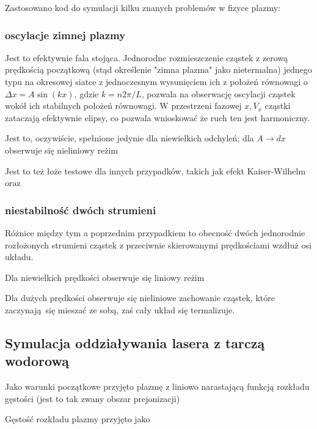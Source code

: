     Zastosowano kod do symulacji kilku znanych problemów w fizyce plazmy:
    \subsubsection{oscylacje zimnej plazmy}
    Jest to efektywnie fala stojąca. Jednorodne rozmieszczenie cząstek z zerową prędkością początkową (stąd określenie
    "zimna plazma" jako nietermalna)
    jednego typu na okresowej siatce z jednoczesnym wysunięciem ich z położeń równowagi o $\Delta x = A \sin(kx)$,
    gdzie $k = n 2 \pi / L$, pozwala na obserwację
    oscylacji cząstek wokół ich stabilnych położeń równowagi. W przestrzeni fazowej $x, V_x$ cząstki zataczają efektywnie
    elipsy, co pozwala wnioskować że ruch ten jest harmoniczny.

    Jest to, oczywiście, spełnione jedynie dla niewielkich odchyleń; dla $A \to dx$ 
    obserwuje się nieliniowy reżim 

    Jest to też łoże testowe 
    dla innych przypadków, takich jak efekt Kaiser-Wilhelm 
    oraz 
    \subsubsection{niestabilność dwóch strumieni}
    Różnice między tym a poprzednim przypadkiem to obecność dwóch jednorodnie rozłożonych strumieni cząstek
    z przeciwnie skierowanymi prędkościami wzdłuż osi układu.

    Dla niewielkich prędkości 
    obserwuje się liniowy reżim 

    Dla dużych prędkości 
     obserwuje się nieliniowe zachowanie cząstek, które zaczynają się mieszać ze sobą, zaś cały układ się termalizuje.
    \subsection{Symulacja oddziaływania lasera z tarczą wodorową}

    Jako warunki początkowe przyjęto plazmę z liniowo narastającą funkcją rozkładu gęstości (jest to tak zwany obszar prejonizacji) 

    Gęstość rozkładu plazmy przyjęto jako

